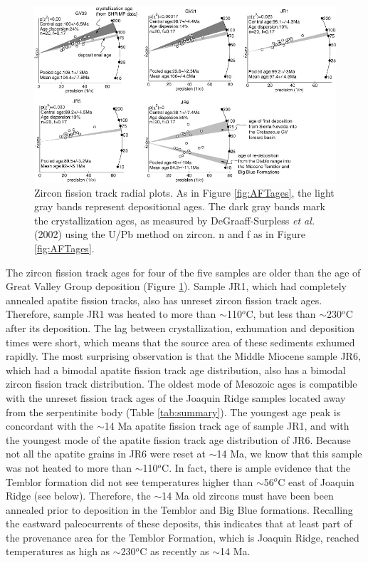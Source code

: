 \documentclass[11pt,twoside]{article}
\begin{document}
\begin{figure}[here]
  \centering
  \includegraphics[width=400pt]{ZFT.jpg}
  \caption{
Zircon fission  track radial  plots.  As in  Figure \ref{fig:AFTages},
the light gray bands represent depositional ages.  The dark gray bands
mark the  crystallization ages, as measured  by DeGraaff-Surpless {\it
et al.}  (2002) using the U/Pb method  on zircon. n and f as in Figure
\ref{fig:AFTages}.}
  \label{fig:ZFTages}
\end{figure}

The zircon fission  track ages for four of the  five samples are older
than   the   age   of    Great   Valley   Group   deposition   (Figure
\ref{fig:ZFTages}).  Sample JR1, which had completely annealed apatite
fission  tracks,   also  has   unreset  zircon  fission   track  ages.
Therefore, sample JR1 was heated to more than $\sim$110$^o$C, but less
than   $\sim$230$^o$C   after  its   deposition.    The  lag   between
crystallization,  exhumation and  deposition times  were  short, which
means that  the source area  of these sediments exhumed  rapidly.  The
most  surprising observation is  that the  Middle  Miocene  sample JR6,
which had a bimodal apatite fission track age distribution, also has a
bimodal zircon fission track distribution. The oldest mode of Mesozoic
ages is compatible with the  unreset fission track ages of the Joaquin
Ridge  samples   located  away  from  the   serpentinite  body  (Table
\ref{tab:summary}).   The youngest  age  peak is  concordant with  the
$\sim$14  Ma apatite fission  track age  of sample  JR1, and  with the
youngest mode  of the apatite  fission track age distribution  of JR6.
Because not all  the apatite grains in JR6 were  reset at $\sim$14 Ma,
we know that  this sample was not heated  to more than $\sim$110$^o$C.
In fact,  there is ample evidence  that the Temblor  formation did not
see temperatures higher than  $\sim$56$^o$C east of Joaquin Ridge (see
below). Therefore,  the $\sim$14  Ma old zircons  must have  been been
annealed prior to  deposition in the Temblor and  Big Blue formations.
Recalling the eastward paleocurrents of these deposits, this indicates
that at least  part of the provenance area  for the Temblor Formation,
which   is   Joaquin   Ridge,   reached  temperatures   as   high   as
$\sim$230$^o$C as recently as $\sim$14 Ma.
\end{document}
